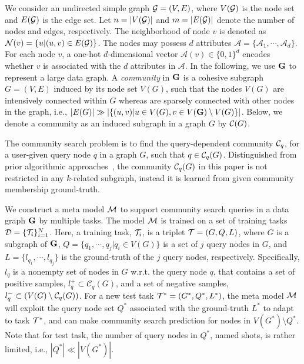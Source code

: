 We consider an undirected simple graph ${\cal G} = (V, E)$, where
$V({\cal G})$ is the node set and $E({\cal G})$ is the edge set. Let
$n = |V({\cal G})|$ and $m = |E({\cal G})|$ denote the number of nodes
and edges, respectively.
The neighborhood of node $v$ is denoted as $\mathcal{N}(v) = \{ u |
(u, v) \in E({\cal G}) \}$.  The nodes may possess $d$ attributes
$\mathcal{A} = \{ \mathcal{A}_1, \cdots, \mathcal{A}_d\}$.  For each
node $v$, a one-hot $d$-dimensional vector $\mathcal{A}(v) \in \{0,
1\}^d$ encodes whether $v$ is associated with the $d$ attributes in
$\mathcal{A}$.
%
In the following, we use ${\bf G}$ to represent a large data graph.  A
\emph{community} in ${\bf G}$ is a cohesive subgraph $G = (V, E)$
induced by its node set $V(G)$, such that the nodes $V(G)$ are
intensively connected within $G$ whereas are sparsely connected with
other nodes in the graph, i.e., $|E(G)| \gg |\{ (u, v) | u \in V(G), v
\in V({\bf G}) \setminus V(G) \}|$.  Below, we denote a community as
an induced subgraph in a graph $G$ by $\mathcal{C}(G)$.

The community search problem is to find the
query-dependent community $\mathcal{C}_q$, for a user-given query node
$q$ in a graph $G$, such that $q \in \mathcal{C}_q(G)$. Distinguished
from prior algorithmic approaches~\cite{ATC, ACQ, CTC}, the community
$\mathcal{C}_q(G)$ in this paper is not restricted in any $k$-related
subgraph, instead it is learned from given community membership
ground-truth.

We construct a meta model $\mathcal{M}$ to
support community search queries in a data graph ${\bf G}$ by multiple
tasks.  The model $\mathcal{M}$ is trained on a set of training tasks
$\mathcal{D} = \{ \mathcal{T}_i\}_{i = 1}^{N}$.  Here, a training task,
$\mathcal{T}_i$, is a triplet $\mathcal{T} = (G, Q, L)$, where $G$ is a subgraph
of ${\bf G}$, $Q= \{ q_1, \cdots, q_{j} | q_{i} \in V(G)\}$ is a set
of $j$ query nodes in $G$, and $L = \{ l_{q_1}, \cdots, l_{q_j}\}$ is
the ground-truth of the $j$ query nodes, respectively.  Specifically,
$l_{q}$ is a nonempty set of nodes in $G$ w.r.t. the query node $q$,
that contains a set of positive samples, $l_q^+ \subset
\mathcal{C}_{q}(G)$, and a set of negative samples, $l_q^{-} \subset
(V(G) \setminus \mathcal{C}_{q}(G))$.
% 
 For a new test task $\mathcal{T}^*= (G^*, Q^*, L^*)$, the meta model $\mathcal{M}$ will exploit the query node set $Q^*$ associated
with the ground-truth $L^*$ to adapt to task $\mathcal{T}^*$, and
can make community search prediction for nodes in $V(G^*)\setminus Q^*$. Note that for test task, the number
of query nodes in $Q^*$, named shots, is rather limited, i.e., $|Q^*| \ll |V(G^*)|$.

